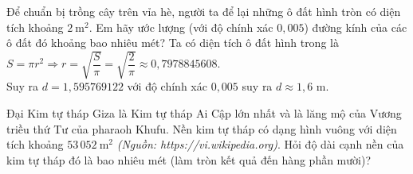 \begin{bt}
	Để chuẩn bị trồng cây trên vỉa hè, người ta để lại những ô đất hình tròn có diện tích khoảng $2 \mathrm{~m}^2$. Em hãy ước lượng (với độ chính xác $0{,}005$) đường kính của các ô đất đó khoảng bao nhiêu mét?
	\loigiai
	{
	Ta có diện tích ô đất hình trong là $S=\pi r^2\Rightarrow r=\sqrt{\dfrac{S}{\pi}}=\sqrt{\dfrac{2}{\pi}}\approx0{,}7978845608$.\\
	Suy ra $d=1{,}595769122$ với độ chính xác $0{,}005$ suy ra $d\approx 1{,}6$ m.
	}
\end{bt}
\begin{bt}
	Đại Kim tự tháp Giza là Kim tự tháp Ai Cập lớn nhất và là lăng mộ của Vương triều thứ Tư của pharaoh Khufu. Nền kim tự tháp có dạng hình vuông với diện tích khoảng $53\, 052 \mathrm{~m}^2$ \textit{(Nguồn: https://vi.wikipedia.org)}. Hỏi độ dài cạnh nền của kim tự tháp đó là bao nhiêu mét (làm tròn kết quả đến hàng phần mười)?
\end{bt}
